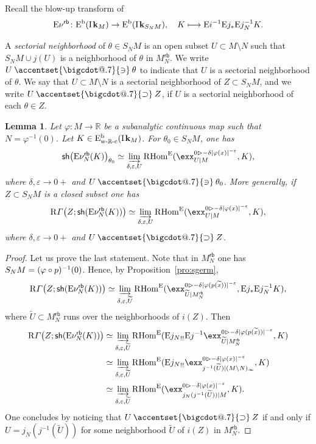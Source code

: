 \documentclass[JEP,XML,SOM,Unicode]{cedram}
\makeatletter
\newcommand\mto{\mathchoice{\longmapsto}{\mapsto}{\mapsto}{\mapsto}}
\let \tilde\oldtilde
\let\tilde\widetilde
\newcommand*\bigcdot{\mathpalette\bigcdot@{.7}}
\newcommand*\bigcdot@[2]{\mathbin{\vcenter{\hbox{\scalebox{#2}{$\m@th#1\bullet$}}}}}
\newcommand{\bdot}[1]{{\accentset{\bigcdot}{#1}}\vphantom{#1}}
\newcommand{\dotowns}{\mathbin{\bdot\owns}}
\newcommand{\dotsupset}{\mathbin{\bdot\supset}}
\newcommand{\bl}{\bigl(}
\newcommand{\br}{\bigr)}
\theoremstyle{plain}
\newtheorem{lemma}[theorem]{Lemma}
\theoremstyle{definition}
\newcommand{\R}{\mathbb{R}}
\newcommand{\derived}[1]{\mathrm{#1}}
\newcommand{\dere}{\derived{E}}\let\enh\dere
\newcommand{\derr}{\derived{R}}
\newcommand{\BEC}[2][\ifield]{\dere^{\mathrm{b}}(#1_{#2})}
\newcommand{\BECwRc}[2][\ifield]{\dere^{\mathrm{b}}_\wRc(#1_{#2})}
\newcommand{\RHom}[1][]{\derr\mathrm{Hom}_{\raise1.5ex\hbox to.1em{}#1}}
\newcommand{\FHom}{\RHom^\enh}
\newcommand{\Eopb}[1]{\enh#1^{-1}}
\newcommand{\Eoim}[1]{\enh#1_*}
\newcommand{\Eeeim}[1]{\enh#1_{!!}}
\newcommand{\Enu}{\enh\nu}
\newcommand{\wRc}{{\mathrm{w}\text-\R\text-\mathrm{c}}}
\newcommand{\field}{\mathbf{k}}\let\cor\field
\newcommand{\ind}{\mathrm{I}\mspace{2mu}}
\newcommand{\ifield}{\ind\field}
\newcommand{\inbordered}[1]{{#1_\infty}}
\let\inb \inbordered
\newcommand{\range}[2]{#1 \mathbin{\rhd} #2}
\newcommand{\rsect}{\derr\varGamma}
\newcommand{\rb}{\mathsf{rb}}
\newcommand{\sh}{\mathsf{sh}}
\newcommand{\RB}[2][N]{#2_{#1}^{\rb}}
\newcommand{\ilim}[1][]{\mathop{\varinjlim}\limits_{#1}}
\newcommand{\opb}[1]{#1^{-1}}
\makeatother
\begin{document}
Recall the blow-up transform of \cite[\S4.4]{DK19nu}
\[
\Enu^\rb\colon\BEC M \to \BEC{S_NM},\quad
K\mto \Eopb i\Eoim j\Eopb j_N K.
\]

A \emph{sectorial neighborhood} of $\theta\in S_NM$ is an open subset $U\subset M\setminus N$ such that $S_N M\cup j (U)$ is a neighborhood of $\theta$ in $\RB M$. We write $U \dotowns \theta$ to indicate that $U$ is a sectorial neighborhood of $\theta$.
We say that $U\subset M\setminus N$ is a sectorial neighborhood of $Z\subset S_NM$, and we write $U\dotsupset Z$, if $U$ is a sectorial neighborhood of each $\theta\in Z$.

\begin{lemma}\label{lem:psiphigerm}
Let $\varphi\colon M\to \R$ be a subanalytic continuous map such that
$N = \varphi^{-1}(0)$.
Let $K\in\BECwRc M$.
For $\theta_0\in S_NM$, one has
\[
\sh\bl\Enu^\rb_N(K)\br_{\theta_0} \simeq
\ilim[\delta,\varepsilon, U]
\FHom( \exx^{\range0{-\delta|\varphi(x)|^{-\varepsilon}}}_{U|M} , K),
\]
where $\delta,\varepsilon\to 0+$ and $U\dotowns \theta_0$.
More generally, if $Z\subset S_NM$ is a \emph{closed} subset one has
\[
\rsect\bl Z;\sh(\Enu^\rb_N(K))\br \simeq
\ilim[\delta,\varepsilon,U]
\FHom( \exx^{\range0{-\delta|\varphi(x)|^{-\varepsilon}}}_{U|M} , K),
\]
where $\delta,\varepsilon\to 0+$ and $U\dotsupset Z$.
\end{lemma}

\begin{proof}
Let us prove the last statement. Note that in $\RB M$ one has $S_NM = (\varphi\circ\nobreak p)^{-1}(0)$. Hence, by Proposition~\ref{pro:sgerm},
\[
\rsect\bl Z;\sh(\Enu^\rb_N(K))\br
\simeq \ilim[\delta,\varepsilon,\widetilde U]\FHom(\exx^{\range0{-\delta|\varphi(p(\tilde x))|^{-\varepsilon}}}_{\widetilde U|\RB M},\Eoim j\Eopb j_N K),
\]
where $\widetilde U\subset\RB M$ runs over the neighborhoods of $i(Z)$.
Then
\begin{align*}
\rsect\bl Z;\sh(\Enu^\rb_N(K))\br
&\simeq \ilim[\delta,\varepsilon,\widetilde U]\FHom(\Eeeim{{j_N}}\Eopb j\exx^{\range0{-\delta|\varphi(p(\tilde x))|^{-\varepsilon}}}_{\widetilde U|\RB M}, K) \\
&\simeq \ilim[\delta,\varepsilon,\widetilde U]\FHom(\Eeeim{{j_N}}\exx^{\range0{-\delta|\varphi(x)|^{-\varepsilon}}}_{\opb j(\widetilde U)|\inb{(M\setminus N)}}, K) \\
&\simeq \ilim[\delta,\varepsilon,\widetilde U]\FHom(\exx^{\range0{-\delta|\varphi(x)|^{-\varepsilon}}}_{j_N(\opb j(\widetilde U))|M},K).
\end{align*}
One concludes by noticing that $U\dotsupset Z$ if and only if $U=j_N(\opb j(\widetilde U))$ for some neighborhood $\widetilde U$ of $i(Z)$ in $\RB M$.
\end{proof}
\end{document}
